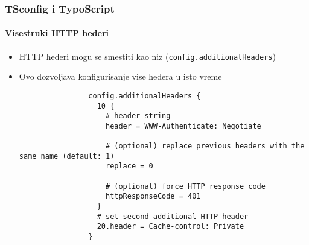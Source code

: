 
\begin{frame}[fragile]
	\frametitle{TSconfig i TypoScript}
	\framesubtitle{Visestruki HTTP hederi}

	\begin{itemize}

		\item HTTP hederi mogu se smestiti kao niz  (\small\texttt{config.additionalHeaders}\normalsize)
		\item Ovo dozvoljava konfigurisanje vise hedera u isto vreme

			\begin{lstlisting}
				config.additionalHeaders {
				  10 {
				    # header string
				    header = WWW-Authenticate: Negotiate

				    # (optional) replace previous headers with the same name (default: 1)
				    replace = 0

				    # (optional) force HTTP response code
				    httpResponseCode = 401
				  }
				  # set second additional HTTP header
				  20.header = Cache-control: Private
				}
			\end{lstlisting}

	\end{itemize}

\end{frame}


